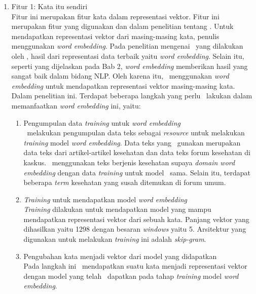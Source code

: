 \begin{enumerate}
	\item Fitur 1: Kata itu sendiri\\
	Fitur ini merupakan fitur kata dalam representasi vektor. Fitur ini merupakan fitur yang digunakan \cite{abacha2011medical} dan \cite{skripsiKakRadit} dalam penelitian tentang \mer. Untuk mendapatkan representasi vektor dari masing-masing kata, penulis menggunakan \textit{word embedding}. Pada penelitian mengenai \mer~yang dilakukan oleh \cite{mujiono2016new}, hasil dari representasi data terbaik yaitu \textit{word embedding}. Selain itu, seperti yang dijelaskan pada Bab 2, \textit{word embedding} memberikan hasil yang sangat baik dalam bidang NLP. Oleh karena itu, \saya~menggunakan \textit{word embedding} untuk mendapatkan representasi vektor masing-masing kata. Dalam penelitian ini. Terdapat beberapa langkah yang perlu \saya~lakukan dalam memanfaatkan \textit{word embedding} ini, yaitu:
	\begin{enumerate}
		\item Pengumpulan data \textit{training} untuk \textit{word embedding}\\
		\Saya~melakukan pengumpulan data teks sebagai \textit{resource} untuk melakukan \textit{training} model \textit{word embedding}. Data teks yang \saya~gunakan merupakan data teks dari artikel-artikel kesehatan dan data teks forum kesehatan di kaskus. \Saya~menggunakan teks berjenis kesehatan supaya \textit{domain word embedding} dengan data \textit{training} untuk model \mer~sama. Selain itu, terdapat beberapa \textit{term} kesehatan yang susah ditemukan di forum umum.
		 
		\item \textit{Training} untuk mendapatkan model \textit{word embedding}\\
		\textit{Training} dilakukan untuk mendapatkan model yang mampu mendapatkan representasi vektor dari sebuah kata. Panjang vektor yang dihasilkan yaitu 1298 dengan besaran \textit{windows} yaitu 5. Arsitektur yang digunakan untuk melakukan \textit{training} ini adalah \textit{skip-gram}.
		
		\item Pengubahan kata menjadi vektor dari model yang didapatkan\\
		Pada langkah ini \saya~mendapatkan suatu kata menjadi representasi vektor dengan model yang telah \saya~dapatkan pada tahap \textit{training} model \textit{word embedding}.
	\end{enumerate}
	

\end{enumerate}
